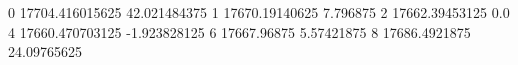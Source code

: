0 17704.416015625 42.021484375
1 17670.19140625 7.796875
2 17662.39453125 0.0
4 17660.470703125 -1.923828125
6 17667.96875 5.57421875
8 17686.4921875 24.09765625
